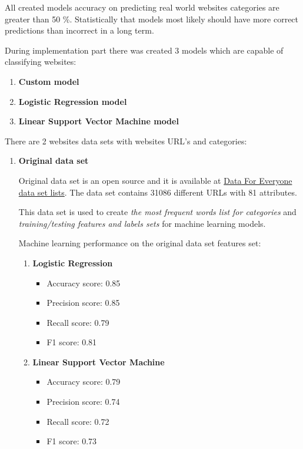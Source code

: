 
All created models accuracy on predicting real world websites categories are greater than 50 \%. Statistically that models most likely should have more correct predictions than incorrect in a long term.

During implementation part there was created 3 models which are capable of classifying websites:
\begin{enumerate}
    \item \textbf{Custom model}
    \item \textbf{Logistic Regression model}
    \item \textbf{Linear Support Vector Machine model}
\end{enumerate}


There are 2 websites data sets with websites URL's and categories:
\begin{enumerate}
    \item \textbf{Original data set}
    
    Original data set is an open source and it is available at \href{https://www.figure-eight.com/data-for-everyone/}{Data For Everyone data set lists}. The data set contains 31086 different URLs with 81 attributes. 
    
    This data set is used to create \textit{the most frequent words list for categories} and \textit{training/testing features and labels sets} for machine learning models.
    
    
    Machine learning performance on the original data set features set:
    \begin{enumerate}
        \item \textbf{Logistic Regression}
        
            \begin{itemize}
                \item Accuracy score: 0.85
                \item Precision score: 0.85
                \item Recall score: 0.79 
                \item F1 score: 0.81
            \end{itemize}
        
        \item \textbf{Linear Support Vector Machine}
        
            \begin{itemize}
                    \item Accuracy score: 0.79
                    \item Precision score: 0.74
                    \item Recall score: 0.72
                    \item F1 score: 0.73
            \end{itemize}
            

\end{enumerate}
\end{enumerate}
